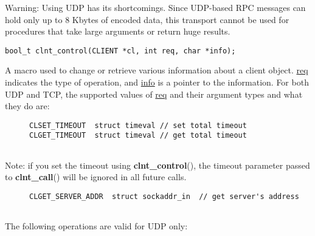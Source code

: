 \documentclass[]{article}
\let\realtextbf=\textbf
\renewcommand{\textbf}[1]{\textcolor{boldcolor}{\realtextbf{#1}}}
\renewcommand{\emph}[1]{\underline{#1}}
\begin{document}
\begin{description}
\itemsep1pt\parskip0pt
\item[]
Warning: Using UDP has its shortcomings. Since UDP-based RPC messages
can hold only up to 8 Kbytes of encoded data, this transport cannot be
used for procedures that take large arguments or return huge results.
\end{description}

\begin{verbatim}
bool_t clnt_control(CLIENT *cl, int req, char *info);
\end{verbatim}

\begin{description}
\itemsep1pt\parskip0pt
\item[]
A macro used to change or retrieve various information about a client
object. \emph{req} indicates the type of operation, and \emph{info} is a
pointer to the information. For both UDP and TCP, the supported values
of \emph{req} and their argument types and what they do are:
\end{description}

\begin{description}
\item[]
\begin{verbatim}
CLSET_TIMEOUT  struct timeval // set total timeout
CLGET_TIMEOUT  struct timeval // get total timeout
    
\end{verbatim}
\end{description}

\begin{description}
\itemsep1pt\parskip0pt
\item[]
Note: if you set the timeout using \textbf{clnt\_control}(), the timeout
parameter passed to \textbf{clnt\_call}() will be ignored in all future
calls.
\end{description}

\begin{description}
\item[]
\begin{verbatim}
CLGET_SERVER_ADDR  struct sockaddr_in  // get server's address
    
\end{verbatim}
\end{description}

\begin{description}
\itemsep1pt\parskip0pt
\item[]
The following operations are valid for UDP only:
\end{description}
\end{document}
